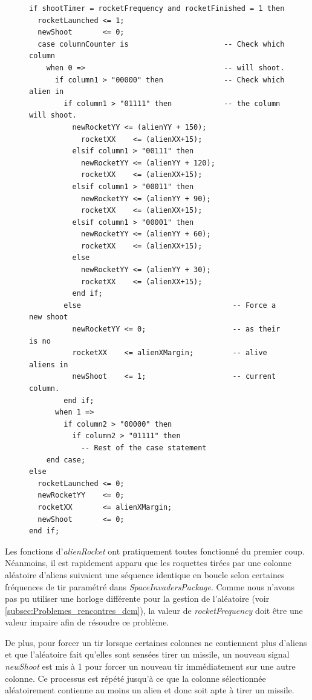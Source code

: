 \documentclass[french]{nakrule}
\begin{document}
\begin{figure}
\begin{lstlisting}[style=vhdl, caption=Tir de rockets]
if shootTimer = rocketFrequency and rocketFinished = 1 then
  rocketLaunched <= 1;
  newShoot       <= 0;
  case columnCounter is                      -- Check which column
    when 0 =>                                -- will shoot.
      if column1 > "00000" then              -- Check which alien in
        if column1 > "01111" then            -- the column will shoot.
          newRocketYY <= (alienYY + 150);
            rocketXX    <= (alienXX+15);
          elsif column1 > "00111" then
            newRocketYY <= (alienYY + 120);
            rocketXX    <= (alienXX+15);
          elsif column1 > "00011" then
            newRocketYY <= (alienYY + 90);
            rocketXX    <= (alienXX+15);
          elsif column1 > "00001" then
            newRocketYY <= (alienYY + 60);
            rocketXX    <= (alienXX+15);
          else
            newRocketYY <= (alienYY + 30);
            rocketXX    <= (alienXX+15);
          end if;
        else                                   -- Force a new shoot
          newRocketYY <= 0;                    -- as their is no
          rocketXX    <= alienXMargin;         -- alive aliens in
          newShoot    <= 1;                    -- current column.
        end if;
      when 1 =>
        if column2 > "00000" then
          if column2 > "01111" then
            -- Rest of the case statement
    end case;
else
  rocketLaunched <= 0;
  newRocketYY    <= 0;
  rocketXX       <= alienXMargin;
  newShoot       <= 0;
end if;
\end{lstlisting}
\end{figure}
Les fonctions d'\emph{alienRocket} ont pratiquement toutes fonctionné du
premier coup. Néanmoins, il est rapidement apparu que les roquettes tirées par
une colonne aléatoire d'aliens suivaient une séquence identique en boucle selon
certaines fréquences de tir paramétré dans \emph{SpaceInvadersPackage}. Comme
nous n'avons pas pu utiliser une horloge différente pour la gestion de
l'aléatoire (voir \ref{subsec:Problemes_rencontres_dcm}), la valeur de
\emph{rocketFrequency} doit être une valeur impaire afin de résoudre ce
problème.

De plus, pour forcer un tir lorsque certaines colonnes ne contiennent plus d'aliens
et que l'aléatoire fait qu'elles sont sensées tirer un missile, un nouveau
signal \emph{newShoot} est mis à 1 pour forcer un nouveau tir immédiatement sur
une autre colonne. Ce processus est répété jusqu'à ce que la colonne
sélectionnée aléatoirement contienne au moins un alien et donc soit apte à tirer
un missile.
\end{document}
